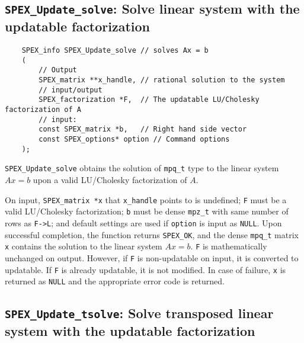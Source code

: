 \documentclass[12pt]{report}
\theoremstyle{definition}
\begin{document}
{%
\subsection{\texttt{SPEX\_Update\_solve}: Solve linear system with the updatable factorization}\label{ss:SPEX_Update_solve}

\begin{mdframed}[userdefinedwidth=6in]
{\footnotesize
\begin{verbatim}
    SPEX_info SPEX_Update_solve // solves Ax = b
    (
        // Output
        SPEX_matrix **x_handle, // rational solution to the system
        // input/output
        SPEX_factorization *F,  // The updatable LU/Cholesky factorization of A
        // input:
        const SPEX_matrix *b,   // Right hand side vector
        const SPEX_options* option // Command options
    );
\end{verbatim}
} \end{mdframed}

\verb|SPEX_Update_solve| obtains the solution of \verb|mpq_t| type to the
linear system $Ax=b$ upon a valid LU/Cholesky factorization of $A$.

On input, \verb|SPEX_matrix *x| that \verb|x_handle| points to is undefined; \verb|F| must be a valid LU/Cholesky factorization; \verb|b| must be dense \verb|mpz_t| with same number of rows as \verb|F->L|; and default settings are used if
\verb|option| is input as \verb|NULL|. Upon successful completion, the function returns \verb|SPEX_OK|, and the dense \verb|mpq_t| matrix \verb|x|
contains the solution  to the linear
system $Ax=b$. \verb|F| is mathematically unchanged on output. However, if \verb|F| is non-updatable on input, it is converted to updatable. If \verb|F| is already updatable, it is not modified.
In case of failure, \verb|x| is returned as \verb|NULL| and the appropriate error code is returned.

\subsection{\texttt{SPEX\_Update\_tsolve}: Solve transposed linear system with the updatable factorization}\label{ss:SPEX_Update_tsolve}

}
\end{document}
